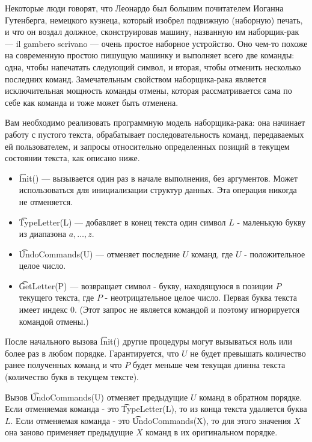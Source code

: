 Некоторые люди говорят, что Леонардо был большим почитателем Иоганна Гутенберга, немецкого кузнеца, который изобрел подвижную (наборную) печать, и что он воздал должное, сконструировав машину, названную им наборщик-рак --- il gambero scrivano --- очень простое наборное устройство. Оно чем-то похоже на современную простою пишущую машинку и выполняет всего две команды: одна, чтобы напечатать следующий символ, и вторая, чтобы отменить несколько последних команд. Замечательным свойством наборщика-рака является исключительная мощность команды отмены, которая рассматривается сама по себе как команда и тоже может быть отменена. 

Вам необходимо реализовать программную модель наборщика-рака: она начинает работу с пустого текста, обрабатывает последовательность команд, передаваемых ей пользователем, и запросы относительно определенных позиций в текущем состоянии текста, как описано ниже.

\begin{itemize}
\item \t{Init()} --- вызывается один раз в начале выполнения, без аргументов. Может использоваться для инициализации структур данных. Эта операция никогда не отменяется.

\item \t{TypeLetter(L)} --- добавляет в конец текста один символ $L$ - маленькую букву из диапазона $a, \dots, z$.

\item \t{UndoCommands(U)} --- отменяет последние $U$ команд, где $U$ - положительное целое число.

\item \t{GetLetter(P)} --- возвращает символ - букву, находящуюся в позиции $P$ текущего текста, где $P$ - неотрицательное целое число. Первая буква текста имеет индекс $0$. (Этот запрос не является командой и поэтому игнорируется командой отмены.)
\end{itemize}

После начального вызова \t{Init()} другие процедуры могут вызываться ноль или более раз в любом порядке. Гарантируется, что $U$ не будет превышать количество ранее полученных команд и что $P$ будет меньше чем текущая длинна текста (количество букв в текущем тексте).

Вызов \t{UndoCommands(U)} отменяет предыдущие $U$ команд в обратном порядке. Если отменяемая команда - это \t{TypeLetter(L)}, то из конца текста удаляется буква $L$. Если отменяемая команда - это \t{UndoCommands(X)}, то для этого значения $X$ она заново применяет предыдущие $X$ команд в их оригинальном порядке.

